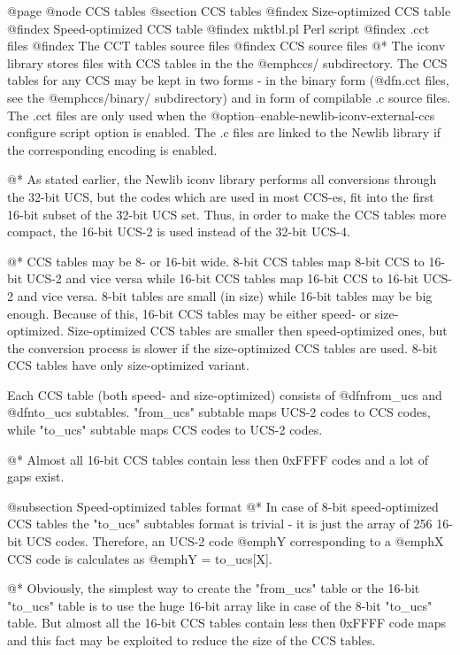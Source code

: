 @page
@node CCS tables
@section CCS tables
@findex Size-optimized CCS table
@findex Speed-optimized CCS table
@findex mktbl.pl Perl script
@findex .cct files
@findex The CCT tables source files
@findex CCS source files
@*
The iconv library stores files with CCS tables in the the @emph{ccs/}
subdirectory. The CCS tables for any CCS may be kept in two forms - in the binary form
(@dfn{.cct files}, see the @emph{ccs/binary/} subdirectory) and in form
of compilable .c source files. The .cct files are only used when the
@option{--enable-newlib-iconv-external-ccs} configure script option is enabled.
The .c files are linked to the Newlib library if the corresponding
encoding is enabled.

@*
As stated earlier, the Newlib iconv library performs all
conversions through the 32-bit UCS, but the codes which are used
in most CCS-es, fit into the first 16-bit subset of the 32-bit UCS set.
Thus, in order to make the CCS tables more compact, the 16-bit UCS-2 is
used instead of the 32-bit UCS-4.

@*
CCS tables may be 8- or 16-bit wide. 8-bit CCS tables map 8-bit CCS to
16-bit UCS-2 and vice versa while 16-bit CCS tables map
16-bit CCS to 16-bit UCS-2 and vice versa.
8-bit tables are small (in size) while 16-bit tables may be big enough.
Because of this, 16-bit CCS tables may be
either speed- or size-optimized. Size-optimized CCS tables are
smaller then speed-optimized ones, but the conversion process is
slower if the size-optimized CCS tables are used. 8-bit CCS tables have only
size-optimized variant.

Each CCS table (both speed- and size-optimized) consists of
@dfn{from_ucs} and @dfn{to_ucs} subtables. "from_ucs" subtable maps
UCS-2 codes to CCS codes, while "to_ucs" subtable maps CCS codes to
UCS-2 codes.

@*
Almost all 16-bit CCS tables contain less then 0xFFFF codes and
a lot of gaps exist.

@subsection Speed-optimized tables format
@*
In case of 8-bit speed-optimized CCS tables the "to_ucs" subtables format is
trivial - it is just the array of 256 16-bit UCS codes. Therefore, an
UCS-2 code @emph{Y} corresponding to a @emph{X} CCS code is calculates
as @emph{Y = to_ucs[X]}.

@*
Obviously, the simplest way to create the "from_ucs" table or the
16-bit "to_ucs" table is to use the huge 16-bit array like in case
of the 8-bit "to_ucs" table. But almost all the 16-bit CCS tables contain
less then 0xFFFF code maps and this fact may be exploited to reduce
the size of the CCS tables.

